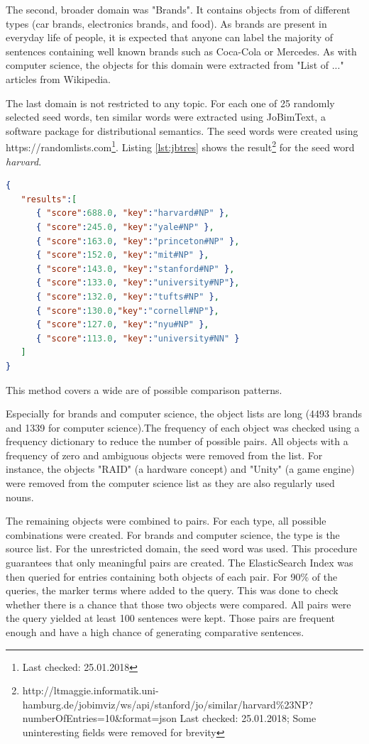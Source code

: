 The second, broader domain was "Brands". It contains objects from of different types (car brands, electronics brands, and food). As brands are present in everyday life of people, it is expected that anyone can label the majority of sentences containing well known brands such as Coca-Cola or Mercedes. As with computer science, the objects for this domain were extracted from "List of ..." articles from Wikipedia.

The last domain is not restricted to any topic. For each one of 25 randomly selected seed words, ten similar words were extracted using JoBimText, a software package for distributional semantics. The seed words were created using https://randomlists.com\footnote{Last checked: 25.01.2018}. Listing \ref{lst:jbtres} shows the result\footnote{http://ltmaggie.informatik.uni-hamburg.de/jobimviz/ws/api/stanford/jo/similar/harvard\%23NP?numberOfEntries=10&format=json Last checked: 25.01.2018; Some uninteresting fields were removed for brevity} for the seed word \emph{harvard}.

\begin{lstlisting}[language=json,label=lst:jbtres,caption=Similar words to "Harvard"]
{
   "results":[
      { "score":688.0, "key":"harvard#NP" },
      { "score":245.0, "key":"yale#NP" },
      { "score":163.0, "key":"princeton#NP" },
      { "score":152.0, "key":"mit#NP" },
      { "score":143.0, "key":"stanford#NP" },
      { "score":133.0, "key":"university#NP"},
      { "score":132.0, "key":"tufts#NP" },
      { "score":130.0,"key":"cornell#NP"},
      { "score":127.0, "key":"nyu#NP" },
      { "score":113.0, "key":"university#NN" }
   ]
}
\end{lstlisting}
This method covers a wide are of possible comparison patterns.\newline

Especially for brands and computer science, the object lists are long (4493 brands and 1339 for computer science).The frequency of each object was checked using a frequency dictionary to reduce the number of possible pairs. All objects with a frequency of zero and ambiguous objects were removed from the list. For instance, the objects "RAID" (a hardware concept) and "Unity" (a game engine) were removed from the computer science list as they are also regularly used nouns.

The remaining objects were combined to pairs. For each type, all possible combinations were created. For brands and computer science, the type is the source list. For the unrestricted domain, the seed word was used. This procedure guarantees that only meaningful pairs are created.
The ElasticSearch Index was then queried for entries containing both objects of each pair. For 90\% of the queries, the marker terms where added to the query. This was done to check whether there is a chance that those two objects were compared. All pairs were the query yielded at least 100 sentences were kept. Those pairs are frequent enough and have a high chance of generating comparative sentences.

